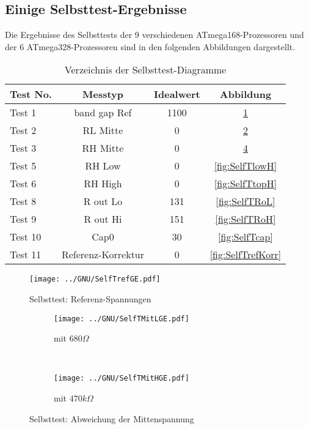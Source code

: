 \subsection{Einige Selbsttest-Ergebnisse}

Die Ergebnisse des Selbsttests der 9 verschiedenen ATmega168-Prozessoren und der 6 ATmega328-Prozessoren
sind in den folgenden Abbildungen dargestellt. 

\begin{table}[H]
  \begin{center}
    \begin{tabular}{| l | c | c | c |}
    \hline
Test No. &  Messtyp    & Idealwert & Abbildung \\
    \hline
    \hline
Test 1 & band gap Ref  & 1100 & \ref{fig:SelfTref} \\
    \hline
Test 2 & RL Mitte & 0 & \ref{fig:SelfTMitL} \\
    \hline
Test 3 & RH Mitte & 0 & \ref{fig:SelfTMitH} \\
    \hline
Test 5 & RH Low &  0 & \ref{fig:SelfTlowH} \\
    \hline
Test 6 & RH High & 0 & \ref{fig:SelfTtopH} \\
    \hline
Test 8 & R out Lo & 131 & \ref{fig:SelfTRoL} \\
    \hline
Test 9 & R out Hi & 151 & \ref{fig:SelfTRoH} \\
    \hline
Test 10 & Cap0  & 30 & \ref{fig:SelfTcap} \\
    \hline
Test 11 & Referenz-Korrektur  & 0 & \ref{fig:SelfTrefKorr} \\
    \hline
    \end{tabular}
  \end{center}
  \caption{Verzeichnis der Selbsttest-Diagramme}
  \label{tab:test_m168} 
\end{table}

\begin{figure}[H]
  \centering
  \texttt{[image: ../GNU/SelfTrefGE.pdf]}
  \caption{Selbsttest: Referenz-Spannungen}
  \label{fig:SelfTref}
\end{figure}

\begin{figure}[H]
  \begin{subfigure}[b]{.5\textwidth}
    \centering
    \texttt{[image: ../GNU/SelfTMitLGE.pdf]}
    \caption{mit \(680 \Omega\)}
    \label{fig:SelfTMitL}
  \end{subfigure}
  ~
  \begin{subfigure}[b]{.5\textwidth}
    \centering
    \texttt{[image: ../GNU/SelfTMitHGE.pdf]}
    \caption{mit \(470 k\Omega\)}
    \label{fig:SelfTMitH}
  \end{subfigure}
  \caption{Selbsttest: Abweichung der Mittenspannung}
\end{figure}

